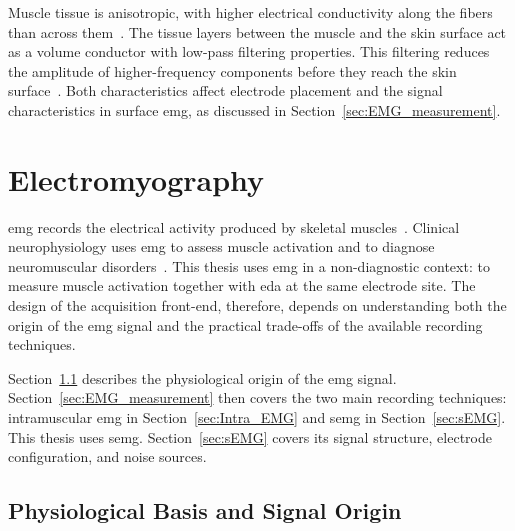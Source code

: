 Muscle tissue is anisotropic, with higher electrical conductivity along the fibers than across them~\cite{kamen_essentials_2010, grimnes_bioimpedance_2015}. The tissue layers between the muscle and the skin surface act as a volume conductor with low-pass filtering properties. This filtering reduces the amplitude of higher-frequency components before they reach the skin surface~\cite{kamen_essentials_2010, konrad_abc_2006}. Both characteristics affect electrode placement and the signal characteristics in surface \gls{emg}, as discussed in Section~\ref{sec:EMG_measurement}.

\FloatBarrier

\section{Electromyography} \label{sec:EMG}
\Gls{emg} records the electrical activity produced by skeletal muscles~\cite{chowdhury_surface_2013}. Clinical neurophysiology uses \gls{emg} to assess muscle activation and to diagnose neuromuscular disorders~\cite{kamen_essentials_2010, whittaker_fundamentals_2012, alcan_current_2023}. This thesis uses \gls{emg} in a non-diagnostic context: to measure muscle activation together with \gls{eda} at the same electrode site. The design of the acquisition front-end, therefore, depends on understanding both the origin of the \gls{emg} signal and the practical trade-offs of the available recording techniques.

Section~\ref{sec:EMG_signal} describes the physiological origin of the \gls{emg} signal. Section~\ref{sec:EMG_measurement} then covers the two main recording techniques: intramuscular \gls{emg} in Section~\ref{sec:Intra_EMG} and \gls{semg} in Section~\ref{sec:sEMG}. This thesis uses \gls{semg}. Section~\ref{sec:sEMG} covers its signal structure, electrode configuration, and noise sources.

\subsection{Physiological Basis and Signal Origin} \label{sec:EMG_signal}

